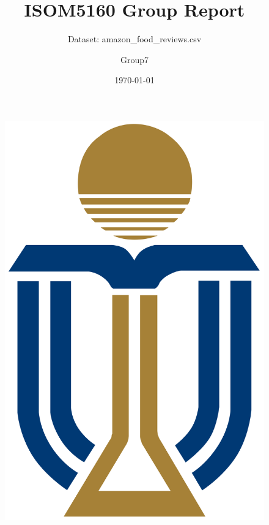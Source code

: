 \documentclass[serif, aspectratio=169]{beamer}
\author{Group7}
\title{ISOM5160 Group Report}
\subtitle{Dataset: amazon\_food\_reviews.csv}
\institute{
    \scriptsize
	\begin{tabular}{llll}
		\toprule
		CAO, Xi & 21271664 & LI, Heyi &   \\
		LIAO, Jingyu & 21262106 & LIN, Chuwei & 21237955  \\
		YE, Chenwei & 21199517 & ZHANG, Ziyang & 21266920  \\
		\bottomrule
	\end{tabular}
	\normalsize
}
\date{\small \today}
\begin{document}
\begin{frame}
    \titlepage
    \vspace*{-0.6cm}
    \begin{figure}[htpb]
        \begin{center}
            \includegraphics[keepaspectratio, scale=0.02]{pic/UST.png}
        \end{center}
    \end{figure}
\end{frame}

\begin{frame}    
\tableofcontents[sectionstyle=show,
subsectionstyle=show/shaded/hide,
subsubsectionstyle=show/shaded/hide]
\end{frame}
\end{document}
